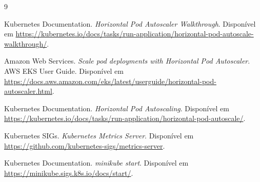 \documentclass[12pt]{article}
\begin{document}
\begin{thebibliography}{9}

Kubernetes Documentation.
\emph{Horizontal Pod Autoscaler Walkthrough}.
Disponível em
\url{https://kubernetes.io/docs/tasks/run-application/horizontal-pod-autoscale-walkthrough/}.

Amazon Web Services.
\emph{Scale pod deployments with Horizontal Pod Autoscaler}.
AWS EKS User Guide. Disponível em
\url{https://docs.aws.amazon.com/eks/latest/userguide/horizontal-pod-autoscaler.html}.

Kubernetes Documentation.
\emph{Horizontal Pod Autoscaling}.
Disponível em
\url{https://kubernetes.io/docs/tasks/run-application/horizontal-pod-autoscale/}.

Kubernetes SIGs.
\emph{Kubernetes Metrics Server}.
Disponível em \url{https://github.com/kubernetes-sigs/metrics-server}.

Kubernetes Documentation.
\emph{minikube start}.
Disponível em \url{https://minikube.sigs.k8s.io/docs/start/}.

\end{thebibliography}
\end{document}
